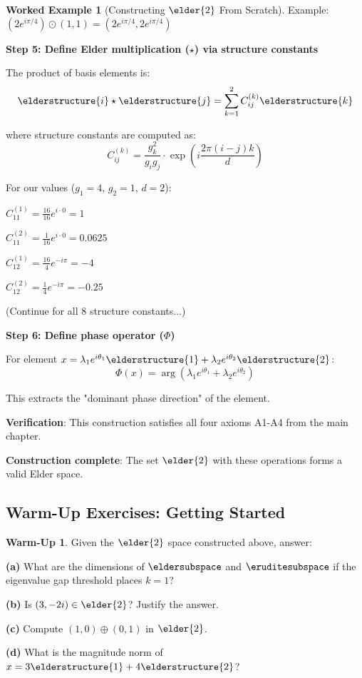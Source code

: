 \documentclass[12pt,a4paper]{book}
\theoremstyle{definition}
\newtheorem{warmup}{Warm-Up}[section]
\newtheorem{example}{Worked Example}[section]
\theoremstyle{remark}
\begin{document}
\begin{example}[Constructing $\elder{2}$ From Scratch]
Example: $(2e^{i\pi/4}) \odot (1, 1) = (2e^{i\pi/4}, 2e^{i\pi/4})$

\textbf{Step 5: Define Elder multiplication ($\star$) via structure constants}

The product of basis elements is:
$$\elderstructure{i} \star \elderstructure{j} = \sum_{k=1}^{2} C_{ij}^{(k)} \elderstructure{k}$$

where structure constants are computed as:
$$C_{ij}^{(k)} = \frac{g_k^2}{g_i g_j} \cdot \exp\left(i\frac{2\pi(i-j)k}{d}\right)$$

For our values ($g_1=4$, $g_2=1$, $d=2$):

$C_{11}^{(1)} = \frac{16}{16} e^{i \cdot 0} = 1$

$C_{11}^{(2)} = \frac{1}{16} e^{i \cdot 0} = 0.0625$

$C_{12}^{(1)} = \frac{16}{4} e^{-i\pi} = -4$

$C_{12}^{(2)} = \frac{1}{4} e^{-i\pi} = -0.25$

(Continue for all 8 structure constants...)

\textbf{Step 6: Define phase operator ($\Phi$)}

For element $x = \lambda_1 e^{i\theta_1} \elderstructure{1} + \lambda_2 e^{i\theta_2} \elderstructure{2}$:
$$\Phi(x) = \arg\left(\lambda_1 e^{i\theta_1} + \lambda_2 e^{i\theta_2}\right)$$

This extracts the "dominant phase direction" of the element.

\textbf{Verification}: This construction satisfies all four axioms A1-A4 from the main chapter.

\textbf{Construction complete}: The set $\elder{2}$ with these operations forms a valid Elder space.
\end{example}

\subsection{Warm-Up Exercises: Getting Started}

\begin{warmup}
Given the $\elder{2}$ space constructed above, answer:

\textbf{(a)} What are the dimensions of $\eldersubspace$ and $\eruditesubspace$ if the eigenvalue gap threshold places $k=1$?

\textbf{(b)} Is $(3, -2i) \in \elder{2}$? Justify the answer.

\textbf{(c)} Compute $(1, 0) \oplus (0, 1)$ in $\elder{2}$.

\textbf{(d)} What is the magnitude norm of $x = 3\elderstructure{1} + 4\elderstructure{2}$?
\end{warmup}
\end{document}

